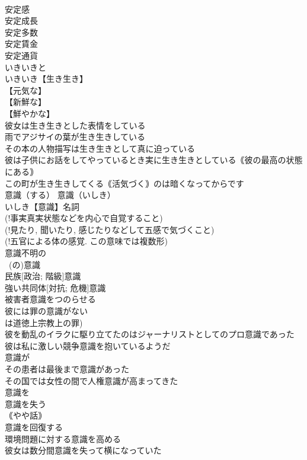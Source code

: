 \documentclass[8pt]{extreport}
\begin{document}
\begin{CJK}{UTF8}{min}
\\	安定感
\\	安定成長
\\	安定多数
\\	安定賃金
\\	安定通貨
\\	いきいきと		
\\	いきいき【生き生き】
\\	【元気な】
\\	【新鮮な】
\\	【鮮やかな】
\\	彼女は生き生きとした表情をしている
\\	雨でアジサイの葉が生き生きしている
\\	その本の人物描写は生き生きとして真に迫っている
\\	彼は子供にお話をしてやっているとき実に生き生きとしている｟彼の最高の状態にある｠
\\	この町が生き生きしてくる｟活気づく｠のは暗くなってからです
\\	意識（する）		意識（いしき）
\\	いしき【意識】名詞
\\	(!事実真実状態などを内心で自覚すること) 
\\	(!見たり, 聞いたり, 感じたりなどして五感で気づくこと) 
\\	(!五官による体の感覚. この意味では複数形) 
\\	意識不明の
\\	~(の)意識
\\	民族[政治; 階級]意識
\\	強い共同体[対抗; 危機]意識
\\	被害者意識をつのらせる
\\	彼には罪の意識がない
\\	は道徳上宗教上の罪)
\\	彼を動乱のイラクに駆り立てたのはジャーナリストとしてのプロ意識であった
\\	彼は私に激しい競争意識を抱いているようだ
\\	意識が
\\	その患者は最後まで意識があった
\\	その国では女性の間で人権意識が高まってきた
\\	意識を
\\	意識を失う
\\	｟やや話｠ 
\\	意識を回復する
\\	環境問題に対する意識を高める
\\	彼女は数分間意識を失って横になっていた

\end{CJK}
\end{document}
